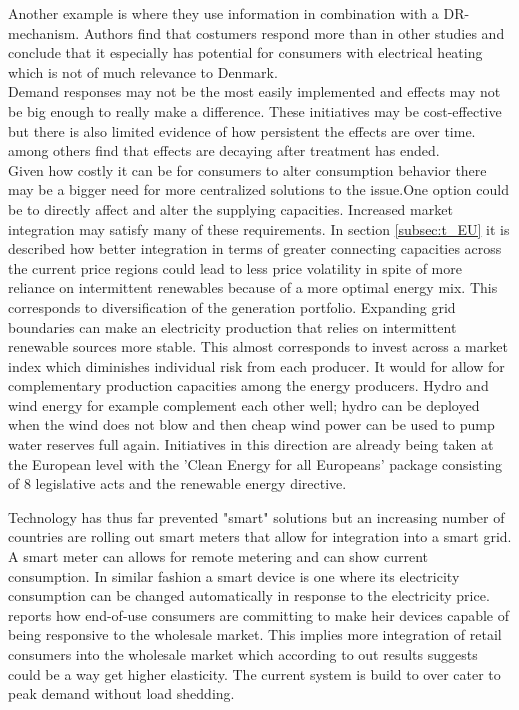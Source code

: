 Another example is \citep{saele2011demand} where they use information in combination with a DR-mechanism. Authors find that costumers respond more than in other studies and conclude that it especially has potential for consumers with electrical heating which is not of much relevance to Denmark.\smallskip \\

Demand responses may not be the most easily implemented and effects may not be big enough to really make a difference. These initiatives may be cost-effective but there is also limited evidence of how persistent the effects are over time. \cite{allcott2014short} among others find that effects are decaying after treatment has ended. \smallskip \\


Given how costly it can be for consumers to alter consumption behavior there may be a bigger need for more centralized solutions to the issue.One option could be to directly affect and alter the supplying capacities.
Increased market integration may satisfy many of these requirements. In section \ref{subsec:t_EU} it is described how better integration in terms of greater connecting capacities across the current price regions could lead to less price volatility in spite of more reliance on intermittent renewables because of a more optimal energy mix. This corresponds to diversification of the generation portfolio. Expanding grid boundaries can make an electricity production that relies on intermittent renewable sources more stable. This almost corresponds to invest across a market index which diminishes individual risk from each producer. It would for allow for complementary production capacities among the energy producers. Hydro and wind energy for example complement each other well;  hydro can be deployed when the wind does not blow and then cheap wind power can be used to pump water reserves full again. Initiatives in this direction are already being taken at the European level with the 'Clean Energy for all Europeans' package consisting of 8 legislative acts and the renewable energy directive.

Technology has thus far prevented "smart" solutions but an increasing number of countries are rolling out smart meters that allow for integration into a smart grid. A smart meter can allows for remote metering and can show current consumption. In similar fashion a smart device is one where its electricity consumption can be changed automatically in response to the electricity price.
\cite{biggar2014economics} reports how end-of-use consumers are committing to make heir devices capable of being responsive to the wholesale market. This implies more integration of retail consumers into the wholesale market which according to out results suggests could be a way get higher elasticity. The current system is build to over cater to peak demand without load shedding. 

